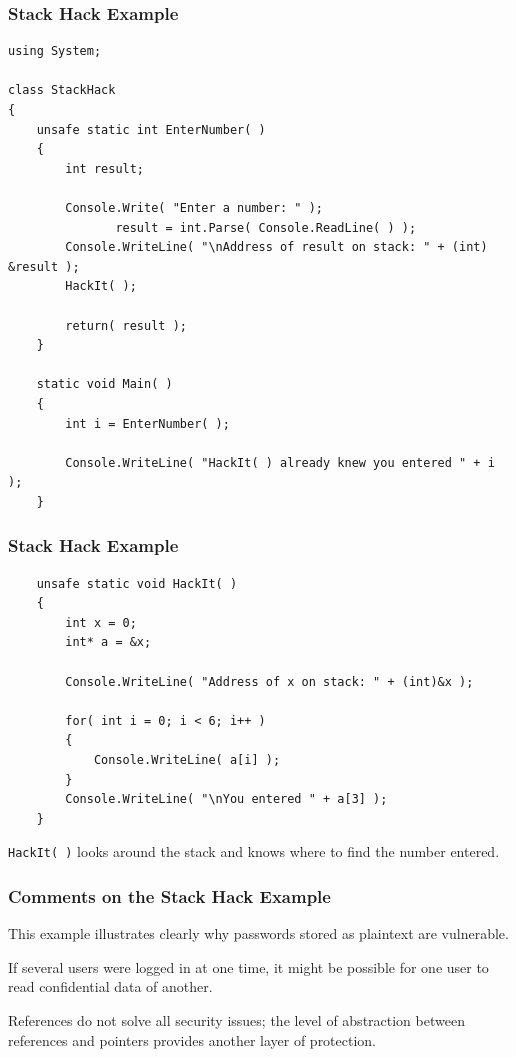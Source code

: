 \begin{frame}[fragile]
\frametitle{Stack Hack Example}
{\scriptsize
\begin{verbatim}
using System;

class StackHack
{
    unsafe static int EnterNumber( )
    {
        int result;

        Console.Write( "Enter a number: " );
               result = int.Parse( Console.ReadLine( ) );
        Console.WriteLine( "\nAddress of result on stack: " + (int) &result );
        HackIt( );

        return( result );
    }

    static void Main( )
    {
        int i = EnterNumber( );

        Console.WriteLine( "HackIt( ) already knew you entered " + i );
    }
\end{verbatim}
}

\end{frame}

\begin{frame}[fragile]
\frametitle{Stack Hack Example}
{\scriptsize
\begin{verbatim}
    unsafe static void HackIt( )
    {
        int x = 0;
        int* a = &x;

        Console.WriteLine( "Address of x on stack: " + (int)&x );
        
        for( int i = 0; i < 6; i++ )
        {
            Console.WriteLine( a[i] );	
        }
        Console.WriteLine( "\nYou entered " + a[3] );
    }
\end{verbatim}
}

\texttt{HackIt( )} looks around the stack and knows where to find the number entered.

\end{frame}

\begin{frame}
\frametitle{Comments on the Stack Hack Example}

This example illustrates clearly why passwords stored as plaintext are vulnerable.

If several users were logged in at one time, it might be possible for one user to read confidential data of another.

References do not solve all security issues; the level of abstraction between references and pointers provides another layer of protection.


\end{frame}

